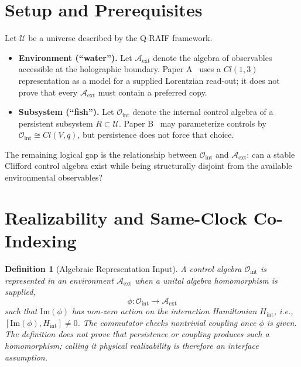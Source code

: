 \documentclass[12pt]{article}
\newtheorem{definition}[theorem]{Definition}
\begin{document}
\section{Setup and Prerequisites}
\label{sec:setup}

Let $\mathcal{U}$ be a universe described by the Q-RAIF framework.
\begin{itemize}
    \item \textbf{Environment (``water'').} Let $\mathcal{A}_{\mathrm{ext}}$ denote the algebra of observables accessible at the holographic boundary.
    Paper A~\cite{Liu2026QRAIF_A} uses a $Cl(1,3)$ representation as a model for a supplied Lorentzian read-out; it does not prove that every $\mathcal A_{\mathrm{ext}}$ must contain a preferred copy.
    \item \textbf{Subsystem (``fish'').} Let $\mathcal{O}_{\mathrm{int}}$ denote the internal control algebra of a persistent subsystem $R\subset\mathcal{U}$.
    Paper B~\cite{Liu2026QRAIF_B} may parameterize controls by $\mathcal{O}_{\mathrm{int}}\cong Cl(V,q)$, but persistence does not force that choice.
\end{itemize}

The remaining logical gap is the relationship between $\mathcal{O}_{\mathrm{int}}$ and $\mathcal{A}_{\mathrm{ext}}$: can a stable Clifford control algebra exist while being structurally disjoint from the available environmental observables?

\section{Realizability and Same-Clock Co-Indexing}
\label{sec:realizability}

\begin{definition}[Algebraic Representation Input]
\label{def:realizability}
A control algebra $\mathcal{O}_{\mathrm{int}}$ is represented in an environment $\mathcal{A}_{\mathrm{ext}}$ when a unital algebra homomorphism is supplied,
\begin{equation}
    \phi: \mathcal{O}_{\mathrm{int}} \to \mathcal{A}_{\mathrm{ext}}
\end{equation}
such that $\mathrm{Im}(\phi)$ has non-zero action on the interaction Hamiltonian $H_{\mathrm{int}}$, i.e., $[\mathrm{Im}(\phi), H_{\mathrm{int}}] \neq 0$.
The commutator checks nontrivial coupling once $\phi$ is given.  The definition does not prove that persistence or coupling produces such a homomorphism; calling it physical realizability is therefore an interface assumption.
\end{definition}
\end{document}
